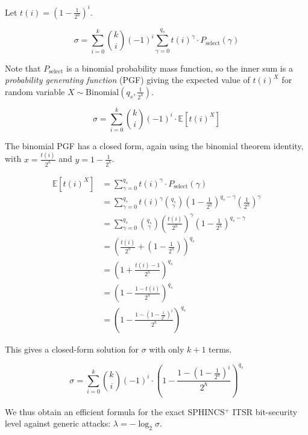 \documentclass[11pt]{article}
\newcommand{\spx}{SPHINCS$^+$\xspace}
\begin{document}
Let $t(i) = \left( 1 - \frac{1}{2^a} \right)^i$.

\begin{equation}
  \sigma = \sum_{i=0}^k \binom{k}{i} (-1)^i \sum_{\gamma=0}^{q_s} t(i)^\gamma \cdot P_\text{select}(\gamma)
\end{equation}

Note that $P_\text{select}$ is a binomial probability mass function, so the inner sum is a \emph{probability generating function} (PGF) giving the expected value of $t(i)^X$ for random variable $X \sim \mathrm{Binomial} \left( q_s, \frac{1}{2^h} \right)$.

\begin{equation}
  \sigma = \sum_{i=0}^k \binom{k}{i} (-1)^i \cdot \mathbb E \left[ t(i)^X \right]
\end{equation}

The binomial PGF has a closed form, again using the binomial theorem identity, with $x = \frac{t(i)}{2^h}$ and $y = 1 - \frac{1}{2^h}$.

\begin{align}
  \mathbb E \left[ t(i)^X \right]
    &= \sum_{\gamma=0}^{q_s} t(i)^\gamma \cdot P_\text{select}(\gamma) \\
    &= \sum_{\gamma=0}^{q_s} t(i)^\gamma \binom{q_s}{\gamma} \left( 1 - \frac{1}{2^h} \right)^{q_s - \gamma} \left( \frac{1}{2^h} \right)^\gamma \\
    &= \sum_{\gamma=0}^{q_s} \binom{q_s}{\gamma} \left( \frac{t(i)}{2^h} \right)^\gamma \left( 1 - \frac{1}{2^h} \right)^{q_s - \gamma}  \\
    &= \left( \frac{t(i)}{2^h} + \left(1 - \frac{1}{2^h} \right) \right)^{q_s} \\
    &= \left(1 +  \frac{t(i) - 1}{2^h} \right)^{q_s} \\
    &= \left(1 - \frac{1 - t(i)}{2^h} \right)^{q_s} \\
    &= \left(1 - \frac{1 - \left( 1 - \frac{1}{2^a} \right)^i}{2^h} \right)^{q_s}
\end{align}

This gives a closed-form solution for $\sigma$ with only $k+1$ terms.

\begin{equation}
\label{eq:fors-closed}
\boxed{
  \sigma = \sum_{i=0}^k \binom{k}{i} (-1)^i \cdot \left(1 - \frac{1 - \left( 1 - \frac{1}{2^a} \right)^i}{2^h} \right)^{q_s}
}
\end{equation}

We thus obtain an efficient formula for the exact \spx ITSR bit-security level against generic attacks: $\lambda = - \log_2 \sigma$.
\end{document}
